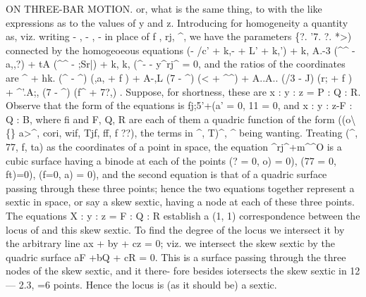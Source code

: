 \documentclass[12pt,a4paper]{article}
\begin{document}
ON THREE-BAR MOTION.
or, what
is the same
thing,
to
with
the
like
expressions
as
to
the
values
of y
and
z.
Introducing
for
homogeneity
a
quantity
as,
viz.
writing -
,
-
,
-
in
place
of
f
,
rj,
\textasciicircum{},
we
have
the
parameters
\{?.
'7.
?.
\guillemotleft{}*>) connected by the homogeoeous equations
(- /c' + k,- + L' + k,') \guillemotleft{}\guillemotright{} + k, A.-3 (\textasciicircum{}\textasciicircum{} - a,,?) + tA (\textasciicircum{}\textasciicircum{} - ;Sr|) + k, k, (\textasciicircum{}- - y\textasciicircum{}rj\textasciicircum{} = 0,
and
the
ratios of the coordinates are
\guillemotright{}\textasciicircum{} + hk. (\textasciicircum{} -
\textasciicircum{})
(\guillemotleft{},a, + f
) + A-,L (7 -
\textasciicircum{}) (<\guillemotleft{} + \textasciicircum{}\textasciicircum{})
+ A..A.. (/3 -
J) (r;\guillemotleft{} + f
) + \textasciicircum{}'.A;, (7 -
\textasciicircum{})
(f\textasciicircum{} + 7?,)
.
Suppose,
for
shortness, these
are x
: y
:
z = P
: Q
: R.
Observe
that
the
form
of
the
equations
is
fj;5'+(a' = 0,
11 = 0, and x
: y
: z-F
: Q
:
B, where
fi
and
F,
Q, R
are each of them a quadric function
of
the
form
((o\textbackslash\{\}
a>\textasciicircum{},
cori,
wif,
Tjf,
ff, f ??), the terms
in
\textasciicircum{},
T)\textasciicircum{}, \textasciicircum{} being wanting.
Treating
(\textasciicircum{},
77,
f,
ta) as the coordinates of a point
in
space, the equation \textasciicircum{}rj\textasciicircum{}+m\textasciicircum{}\textasciicircum{}O
is
a
cubic
surface
having
a
binode
at
each
of
the
points (? = 0,
o) = 0),
(77 = 0,
ft)=0),
(f=0,
a) = 0),
and
the
second
equation
is
that
of
a
quadric
surface
passing
through
these
three
points;
hence
the
two
equations
together
represent
a
sextic
in
space,
or
say
a
skew
sextic,
having
a
node
at
each
of
these
three
points.
The
equations
X
: y
:
z = F
: Q
: R
establish
a
(1,
1)
correspondence
between
the
locus
of
and
this
skew
sextic.
To
find the degree
of
the
locus we
intersect
it by the
arbitrary
line
ax + by + cz = 0;
viz. we intersect the skew sextic by the quadric
surface aF +bQ + cR = 0.
This
is
a
surface
passing
through
the
three
nodes
of
the
skew
sextic,
and
it
there-
fore
besides
iotersects
the
skew
sextic
in
12 --- 2.3, =6
points.
Hence
the
locus
is
(as
it should be) a
sextic.
\end{document}
